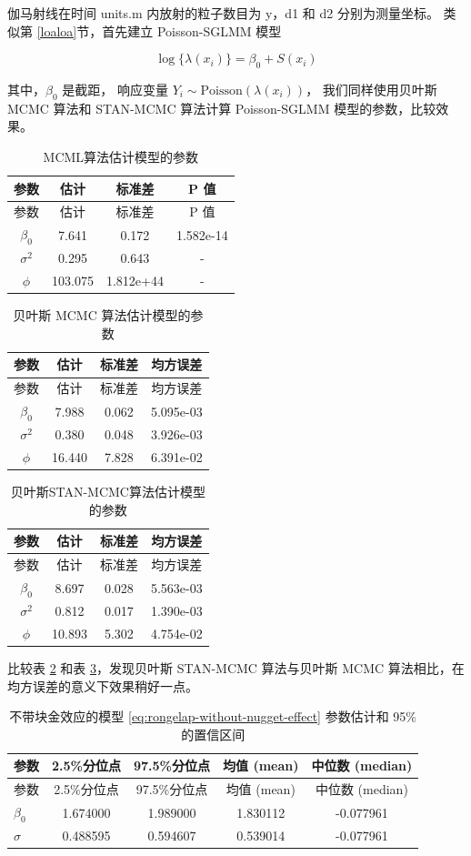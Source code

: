 \documentclass[12pt,a4paper,UTF8,twoside]{book}
\theoremstyle{definition}
\theoremstyle{definition}
\theoremstyle{definition}
\theoremstyle{remark}
\begin{document}
伽马射线在时间 units.m 内放射的粒子数目为 y，d1 和 d2 分别为测量坐标。
类似第 \ref{loaloa}节，首先建立 Poisson-SGLMM 模型

\begin{equation}
\log\{\lambda(x_{i})\} =  \beta_{0} + S(x_{i}) \label{eq:rongelap-without-nugget-effect}
\end{equation}

其中，\(\beta_0\) 是截距， 响应变量
\(Y_{i} \sim \mathrm{Poisson}(\lambda(x_i))\)， 我们同样使用贝叶斯 MCMC
算法和 STAN-MCMC 算法计算 Poisson-SGLMM 模型的参数，比较效果。

\begin{longtable}[]{@{}cccc@{}}
\caption{\label{tab:rongelap-estimation1}
MCML算法估计模型的参数}\tabularnewline
\toprule
参数 & 估计 & 标准差 & P 值\tabularnewline
\midrule
\endfirsthead
\toprule
参数 & 估计 & 标准差 & P 值\tabularnewline
\midrule
\endhead
\(\beta_{0}\) & 7.641 & 0.172 & 1.582e-14\tabularnewline
\(\sigma^2\) & 0.295 & 0.643 & -\tabularnewline
\(\phi\) & 103.075 & 1.812e+44 & -\tabularnewline
\bottomrule
\end{longtable}

\begin{longtable}[]{@{}cccc@{}}
\caption{\label{tab:rongelap-estimation2} 贝叶斯 MCMC
算法估计模型的参数}\tabularnewline
\toprule
参数 & 估计 & 标准差 & 均方误差\tabularnewline
\midrule
\endfirsthead
\toprule
参数 & 估计 & 标准差 & 均方误差\tabularnewline
\midrule
\endhead
\(\beta_{0}\) & 7.988 & 0.062 & 5.095e-03\tabularnewline
\(\sigma^2\) & 0.380 & 0.048 & 3.926e-03\tabularnewline
\(\phi\) & 16.440 & 7.828 & 6.391e-02\tabularnewline
\bottomrule
\end{longtable}

\begin{longtable}[]{@{}cccc@{}}
\caption{\label{tab:rongelap-estimation3}
贝叶斯STAN-MCMC算法估计模型的参数}\tabularnewline
\toprule
参数 & 估计 & 标准差 & 均方误差\tabularnewline
\midrule
\endfirsthead
\toprule
参数 & 估计 & 标准差 & 均方误差\tabularnewline
\midrule
\endhead
\(\beta_{0}\) & 8.697 & 0.028 & 5.563e-03\tabularnewline
\(\sigma^2\) & 0.812 & 0.017 & 1.390e-03\tabularnewline
\(\phi\) & 10.893 & 5.302 & 4.754e-02\tabularnewline
\bottomrule
\end{longtable}

比较表 \ref{tab:rongelap-estimation2} 和表
\ref{tab:rongelap-estimation3}，发现贝叶斯 STAN-MCMC 算法与贝叶斯 MCMC
算法相比，在均方误差的意义下效果稍好一点。

\begin{longtable}[]{@{}lcccc@{}}
\caption{\label{tab:rongelap-without-nugget-effect} 不带块金效应的模型
\eqref{eq:rongelap-without-nugget-effect} 参数估计和 95\%
的置信区间}\tabularnewline
\toprule
参数 & 2.5\%分位点 & 97.5\%分位点 & 均值 (mean) & 中位数
(median)\tabularnewline
\midrule
\endfirsthead
\toprule
参数 & 2.5\%分位点 & 97.5\%分位点 & 均值 (mean) & 中位数
(median)\tabularnewline
\midrule
\endhead
\(\beta_0\) & 1.674000 & 1.989000 & 1.830112 & -0.077961\tabularnewline
\(\sigma\) & 0.488595 & 0.594607 & 0.539014 & -0.077961\tabularnewline
\bottomrule
\end{longtable}
\end{document}
